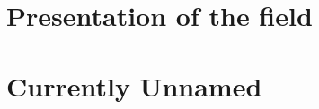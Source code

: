 \documentclass[12pt]{book}
\begin{document}

%
%


%
%

\dominitoc
\tableofcontents

%
%

%

%
%

%



%
%

\chapter{Presentation of the field}

\vfill\minitoc\newpage

\newpage
\newpage
\newpage

%
%

%


\chapter{Currently Unnamed}
\vfill\minitoc\newpage
\newpage

%
%

%
%

%
%
\end{document}
